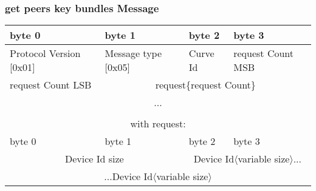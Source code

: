 \documentclass[a4paper,11pt]{article}
\begin{document}
    \subsubsection{get peers key bundles Message}
      \begin{center}
      \begin{tabular}{ | p{1.4in} | p{1.4in} | p{1.4in} | p{1.4in} |}
        \hline
        \cellcolor[gray]{0.85} byte 0 & \cellcolor[gray]{0.85} byte 1 & \cellcolor[gray]{0.85} byte 2 & \cellcolor[gray]{0.85}byte 3\\
        \hline
        Protocol Version [0x01] & Message type [0x05] & Curve Id & request Count MSB\\
        \hline
        request Count LSB & \multicolumn{3}{c|}{request\{request Count\}}\\
        \cline{1-1}
        \multicolumn{4}{|c|}{...}\\
        \hline
        \multicolumn{4}{c}{}\\
        \multicolumn{4}{c}{with request:}\\
        \hline
        \cellcolor[gray]{0.95} byte 0 & \cellcolor[gray]{0.95} byte 1 & \cellcolor[gray]{0.95} byte 2 & \cellcolor[gray]{0.95}byte 3\\
        \hline
        \multicolumn{2}{|c}{Device Id size}&\multicolumn{2}{|c|}{Device Id$\langle$variable size$\rangle$...}\\
        \hline
        \multicolumn{4}{|c|}{...Device Id$\langle$variable size$\rangle$}\\
        \hline
      \end{tabular}
      \end{center}
\end{document}
